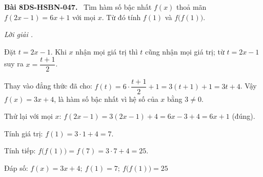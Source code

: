 \documentclass[12pt,a4paper]{article}
\newenvironment{problem}[1][]{\par\medskip\noindent\textbf{Bài #1.}\ }{\par}
\newenvironment{solution}[1][]{\par\noindent\textit{Lời giải #1.}\par}{\par}
\begin{document}
\begin{problem}[8DS-HSBN-047]
Tìm hàm số bậc nhất $f(x)$ thoả mãn $f(2x - 1) = 6x + 1$ với mọi $x$. Từ đó tính $f(1)$ và $f\big(f(1)\big)$.

\begin{solution}
Đặt $t = 2x - 1$. Khi $x$ nhận mọi giá trị thì $t$ cũng nhận mọi giá trị; từ $t = 2x - 1$ suy ra $x = \dfrac{t + 1}{2}$.

Thay vào đẳng thức đã cho: $f(t) = 6 \cdot \dfrac{t + 1}{2} + 1 = 3(t + 1) + 1 = 3t + 4$. Vậy $f(x) = 3x + 4$, là hàm số bậc nhất vì hệ số của $x$ bằng $3 \neq 0$.

Thử lại với mọi $x$: $f(2x - 1) = 3(2x - 1) + 4 = 6x - 3 + 4 = 6x + 1$ (đúng).

Tính giá trị: $f(1) = 3 \cdot 1 + 4 = 7$.

Tính tiếp: $f\big(f(1)\big) = f(7) = 3 \cdot 7 + 4 = 25$.

Đáp số: $\boxed{f(x) = 3x + 4;\ f(1) = 7;\ f\big(f(1)\big) = 25}$
\end{solution}
\end{problem}
\end{document}
